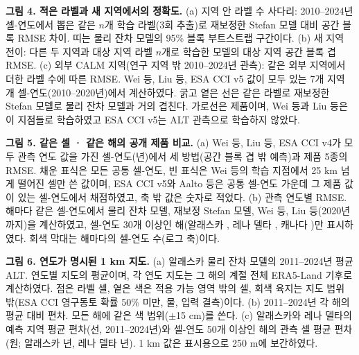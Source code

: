 \textbf{그림 4. 적은 라벨과 새 지역에서의 정확도.} (a) 지역 안 라벨 수 사다리: 2010--2024년 셀-연도에서 뽑은 같은 $n$개 학습 라벨(3회 추출)로 재보정한 Stefan 모델 대비 공간 블록 RMSE 차이. 띠는 물리 잔차 모델의 95\% 블록 부트스트랩 구간이다. (b) 새 지역 전이: 다른 두 지역과 대상 지역 라벨 $n$개로 학습한 모델의 대상 지역 공간 블록 겹 RMSE. (c) 외부 CALM 지역(연구 지역 밖 2010--2024년 관측): 같은 외부 지역에서 더한 라벨 수에 따른 RMSE. Wei 등, Liu 등, ESA CCI v5 값이 모두 있는 7개 지역 \nftrows{}개 셀-연도(2010--2020년)에서 계산하였다. 굵고 옅은 선은 같은 라벨로 재보정한 Stefan 모델로 물리 잔차 모델과 거의 겹친다. 가로선은 제품이며, Wei 등과 Liu 등은 이 지점들로 학습하였고 ESA CCI v5는 ALT 관측으로 학습하지 않았다.

\textbf{그림 5. 같은 셀 · 같은 해의 공개 제품 비교.} (a) Wei 등, Liu 등, ESA CCI v4가 모두 관측 연도 값을 가진 셀-연도(\nyrscc{}년)에서 세 방법(공간 블록 겹 밖 예측)과 제품 5종의 RMSE. 채운 표식은 모든 공통 셀-연도, 빈 표식은 Wei 등의 학습 지점에서 25 km 넘게 떨어진 셀만 쓴 값이며, ESA CCI v5와 Aalto 등은 공통 셀-연도 가운데 그 제품 값이 있는 셀-연도에서 채점하였고, 축 밖 값은 숫자로 적었다. (b) 관측 연도별 RMSE. 해마다 같은 셀-연도에서 물리 잔차 모델, 재보정 Stefan 모델, Wei 등, Liu 등(2020년까지)을 계산하였고, 셀-연도 30개 이상인 해(알래스카 \nyrsywAkko, 레나 델타 \nyrsywLeko, 캐나다 \nyrsywCako)만 표시하였다. 회색 막대는 해마다의 셀-연도 수(로그 축)이다.

\textbf{그림 6. 연도가 명시된 1 km 지도.} (a) 알래스카 물리 잔차 모델의 2011--2024년 평균 ALT. 연도별 지도의 평균이며, 각 연도 지도는 그 해의 계절 전체 ERA5-Land 기후로 계산하였다. 점은 라벨 셀, 옅은 색은 적용 가능 영역 밖의 셀, 회색 육지는 지도 범위 밖(ESA CCI 영구동토 확률 50\% 미만, 물, 입력 결측)이다. (b) 2011--2024년 각 해의 평균 대비 편차. 모든 해에 같은 색 범위($\pm$15 cm)를 쓴다. (c) 알래스카와 레나 델타의 예측 지역 평균 편차(선, 2011--2024년)와 셀-연도 50개 이상인 해의 관측 셀 평균 편차(원; 알래스카 \nanobsyrsAk{}년, 레나 델타 \nanobsyrsLe{}년). 1 km 값은 표시용으로 250 m에 보간하였다.
